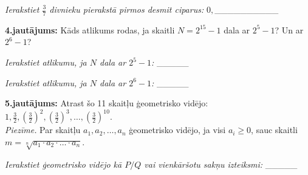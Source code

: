 \documentclass[11pt]{article}
\newenvironment{uzdevums}[1][\unskip]{%
\vspace{3mm}
\noindent
\textbf{#1:}
\noindent}
{}
\begin{document}
\vspace{2ex}
{\em Ierakstiet $\frac{3}{7}$ divnieku pierakstā pirmos desmit ciparus:} $0,$\_\_\_\_\_\_\_\_\_\_


\vspace{6ex}
\begin{uzdevums}[4.jautājums]
Kāds atlikums rodas, ja skaitli $N=2^{15}-1$ dala ar $2^5-1$? Un ar $2^6-1$? 
\end{uzdevums}

\vspace{2ex}
{\em Ierakstiet atlikumu, ja $N$ dala ar $2^5-1$:} \_\_\_\_\_

\noindent
{\em Ierakstiet atlikumu, ja $N$ dala ar $2^6-1$:} \_\_\_\_\_

\vspace{6ex}
\begin{uzdevums}[5.jautājums]
Atrast šo 11 skaitļu ģeometrisko vidējo: $1, \frac{3}{2}, \left( \frac{3}{2} \right)^2, \left( \frac{3}{2} \right)^3, \ldots, \left( \frac{3}{2} \right)^{10}$.\\
{\em Piezīme.} Par skaitļu $a_1,a_2,\ldots,a_n$ ģeometrisko vidējo, ja visi $a_i \geq 0$, sauc skaitli 
$m = \sqrt[n]{a_1\cdot{}a_2\cdot\ldots\cdot{}a_n}$. 
\end{uzdevums}

\vspace{2ex}
{\em Ierakstiet ģeometrisko vidējo kā $P/Q$ vai vienkāršotu sakņu izteiksmi:} \_\_\_\_\_
\end{document}
